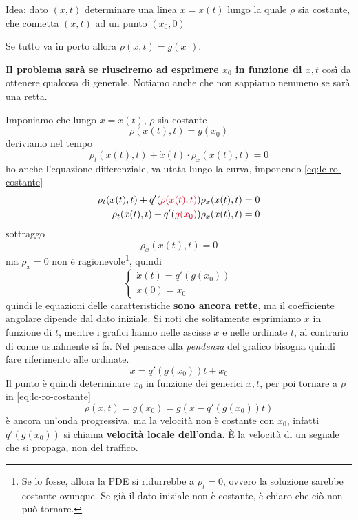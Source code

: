 Idea: dato $(x,t)$ determinare una linea $x=x(t)$ lungo la quale $\rho $ sia costante, che connetta $(x,t)$ ad un punto $(x_{0} ,0)$


Se tutto va in porto allora $\rho (x,t) =g(x_{0})$.

\textbf{Il problema sarà se riusciremo ad esprimere $x_{0}$ in funzione di $x,t$} così da ottenere qualcosa di generale. Notiamo anche che non sappiamo nemmeno se sarà una retta.

Imponiamo che lungo $x=x(t)$, $\rho $ sia costante
\begin{equation}
    \rho (x(t) ,t) =g(x_{0})
    \label{eq:lc-ro-costante}
\end{equation}
deriviamo nel tempo
\begin{equation*}
    \rho _{t}(x(t) ,t) +\dot{x}(t) \cdotp \rho _{x}(x(t) ,t) =0
\end{equation*}
ho anche l'equazione differenziale, valutata lungo la curva, imponendo \eqref{eq:lc-ro-costante}
\begin{align*}
    \rho _{t}(x(t) ,t) +q'(\textcolor[rgb]{0.82,0.01,0.11}{\rho (x(t) ,t)}) \rho _{x}(x(t) ,t) & =0 \\
    \rho _{t}(x(t) ,t) +q'(\textcolor[rgb]{0.82,0.01,0.11}{g(x_{0})}) \rho _{x}(x(t) ,t)       & =0
\end{align*}
sottraggo
\begin{equation*}
    [\dot{x}(t) -q'(g(x_{0}))] \rho _{x}(x(t) ,t) =0
\end{equation*}
ma $\rho _{x} =0$ non è ragionevole\footnote{Se lo fosse, allora la PDE si ridurrebbe a $\rho _{t}=0$, ovvero la soluzione sarebbe costante ovunque. Se già il dato iniziale non è costante, è chiaro che ciò non può tornare.}, quindi
\begin{equation*}
    \begin{cases}
        \dot{x}(t) =q'(g(x_{0})) \\
        x(0) =x_{0}
    \end{cases}
\end{equation*}
quindi le equazioni delle caratteristiche \textbf{sono ancora rette}, ma il coefficiente angolare dipende dal dato iniziale. Si noti che solitamente esprimiamo $x$ in funzione di $t$, mentre i grafici hanno nelle ascisse $x$ e nelle ordinate $t$, al contrario di come usualmente si fa. Nel pensare alla \emph{pendenza} del grafico bisogna quindi fare riferimento alle ordinate.
\begin{equation}
    x=q'(g(x_{0})) t+x_{0}
\end{equation}
Il punto è quindi determinare $x_{0}$ in funzione dei generici $x,t$, per poi tornare a $\rho $ in \eqref{eq:lc-ro-costante}
\begin{equation}
    \rho (x,t) =g(x_{0}) =g(x-q'(g(x_{0})) t)
    \label{eq:lc-sol-ro-traffico}
\end{equation}
è ancora un'onda progressiva, ma la velocità non è costante con $x_{0}$, infatti $q'(g(x_{0}))$ si chiama \textbf{velocità locale dell'onda}. È la velocità di un segnale che si propaga, non del traffico.

